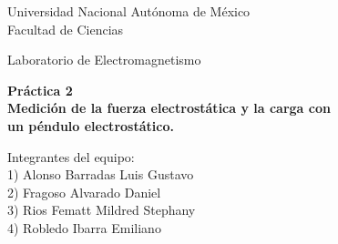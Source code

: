 \documentclass[letterpaper, 11 pt]{article}
\begin{document}
\begin{center}
\vspace*{0.2in}
{\fontsize{21}{21}\selectfont Universidad Nacional Autónoma de México}\\
\vspace*{0.2in}
{\fontsize{18}{18}\selectfont Facultad de Ciencias}\\
\vspace*{0.2in}
\begin{large}
{\fontsize{14}{14}\selectfont Laboratorio de Electromagnetismo} \\
\end{large}
\vspace*{0.2in}
\vspace*{0.2in}
\begin{Large}
\textbf{Práctica 2} \\
\textbf{Medición de la fuerza electrostática y la carga con \\ un péndulo electrostático.} \\
\end{Large}
\vspace{.7 cm}
Integrantes del equipo:\\
1) Alonso Barradas Luis Gustavo\\ 
2) Fragoso Alvarado Daniel\\ 
3) Rios Fematt Mildred Stephany\\ 
4) Robledo Ibarra Emiliano\\

\end{center}
\end{document}
